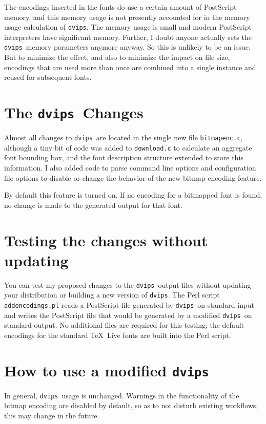 \documentclass[final]{ltugboat}
\def\dvips{\texttt{dvips}}
\begin{document}
The encodings inserted in the fonts do use a certain amount of
PostScript memory, and this memory usage is not presently
accounted for in the memory usage calculation of \dvips.
The memory usage is small and modern PostScript interpreters
have significant memory. Further, I doubt anyone actually sets
the \dvips\ memory parameters anymore anyway.  So this is unlikely
to be an issue.  But to minimize the effect, and also to
minimize the impact on file size, encodings that are used more
than once are combined into a single instance and reused for
subsequent fonts.

\section{The \dvips\ Changes}

Almost all changes to \dvips\ are located in the single new
file \texttt{bitmapenc.c}, although a tiny bit of code was
added to \texttt{download.c} to calculate an aggregate font
bounding box, and the font description structure extended to
store this information.  I also added code to parse command
line options and configuration file options to disable or
change the behavior of the new bitmap encoding feature.

By default this feature is turned on.
If no encoding for a bitmapped font is found, no
change is made to the generated output for that font.

\section{Testing the changes without updating}

You can test my proposed changes to the \dvips\ output
files without updating your distribution or building a new
version of \dvips.  The Perl script
\texttt{addencodings.pl} \cite{T3S}
reads a PostScript file generated by \dvips\ on
standard input and writes the PostScript file that would be
generated by a modified \dvips\ on standard output.  No
additional files are required for this testing; the default
encodings for the standard \TeX\ Live fonts are built into
the Perl script.

\section{How to use a modified \dvips}

In general, \dvips\ usage is unchanged.  Warnings in
the functionality of the bitmap encoding are disabled by default,
so as to not disturb existing workflows; this may
change in the future.
\end{document}

